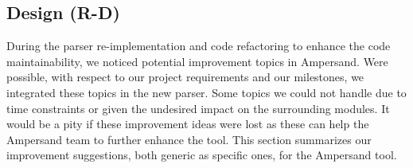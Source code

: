 
\subsection{Design (R-D)}
\label{recommendations:design}
During the parser re-implementation and code refactoring to enhance the code maintainability, we noticed potential improvement topics in Ampersand.
Were possible, with respect to our project requirements and our milestones, we integrated these topics in the new parser.
Some topics we could not handle due to time constraints or given the undesired impact on the surrounding modules.
It would be a pity if these improvement ideas were lost as these can help the Ampersand team to further enhance the tool.
This section summarizes our improvement suggestions, both generic as specific ones, for the Ampersand tool.


